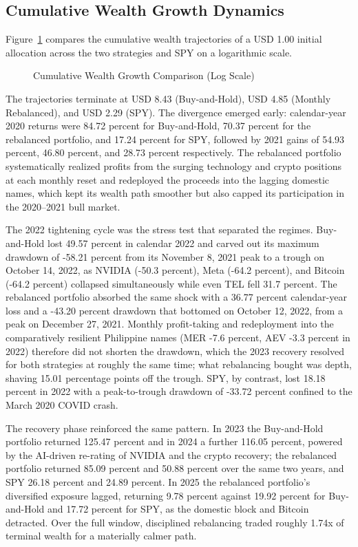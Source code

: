 \subsection{Cumulative Wealth Growth Dynamics}

Figure~\ref{fig:portfolio_growth} compares the cumulative wealth trajectories of a USD 1.00 initial allocation across the two strategies and SPY on a logarithmic scale.

\begin{figure}[H]
  \centering
  \caption{Cumulative Wealth Growth Comparison (Log Scale)}
  \label{fig:portfolio_growth}
\end{figure}

The trajectories terminate at USD 8.43 (Buy-and-Hold), USD 4.85 (Monthly Rebalanced), and USD 2.29 (SPY). The divergence emerged early: calendar-year 2020 returns were 84.72 percent for Buy-and-Hold, 70.37 percent for the rebalanced portfolio, and 17.24 percent for SPY, followed by 2021 gains of 54.93 percent, 46.80 percent, and 28.73 percent respectively. The rebalanced portfolio systematically realized profits from the surging technology and crypto positions at each monthly reset and redeployed the proceeds into the lagging domestic names, which kept its wealth path smoother but also capped its participation in the 2020--2021 bull market.

The 2022 tightening cycle was the stress test that separated the regimes. Buy-and-Hold lost 49.57 percent in calendar 2022 and carved out its maximum drawdown of -58.21 percent from its November 8, 2021 peak to a trough on October 14, 2022, as NVIDIA (-50.3 percent), Meta (-64.2 percent), and Bitcoin (-64.2 percent) collapsed simultaneously while even TEL fell 31.7 percent. The rebalanced portfolio absorbed the same shock with a 36.77 percent calendar-year loss and a -43.20 percent drawdown that bottomed on October 12, 2022, from a peak on December 27, 2021. Monthly profit-taking and redeployment into the comparatively resilient Philippine names (MER -7.6 percent, AEV -3.3 percent in 2022) therefore did not shorten the drawdown, which the 2023 recovery resolved for both strategies at roughly the same time; what rebalancing bought was depth, shaving 15.01 percentage points off the trough. SPY, by contrast, lost 18.18 percent in 2022 with a peak-to-trough drawdown of -33.72 percent confined to the March 2020 COVID crash.

The recovery phase reinforced the same pattern. In 2023 the Buy-and-Hold portfolio returned 125.47 percent and in 2024 a further 116.05 percent, powered by the AI-driven re-rating of NVIDIA and the crypto recovery; the rebalanced portfolio returned 85.09 percent and 50.88 percent over the same two years, and SPY 26.18 percent and 24.89 percent. In 2025 the rebalanced portfolio's diversified exposure lagged, returning 9.78 percent against 19.92 percent for Buy-and-Hold and 17.72 percent for SPY, as the domestic block and Bitcoin detracted. Over the full window, disciplined rebalancing traded roughly 1.74x of terminal wealth for a materially calmer path.

